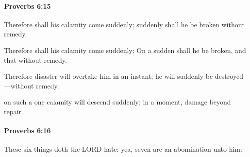 		\paragraph{Proverbs 6:15} %
			\label{PROVERBS-6-15}

			Therefore shall his calamity come suddenly; suddenly shall he be broken without remedy.

			\begin{versebox}
					\item[BHS] 
					\item[ASV] Therefore shall his calamity come suddenly; On a sudden shall he be broken, and that without remedy.
					\item[NIV] Therefore disaster will overtake him in an instant; he will suddenly be destroyed—without remedy.
					\item[NRSV] on such a one calamity will descend suddenly; in a moment, damage beyond repair.
			\end{versebox}

		\paragraph{Proverbs 6:16} %
			\label{PROVERBS-6-16}

			These six things doth the LORD hate: yea, seven are an abomination unto him:

